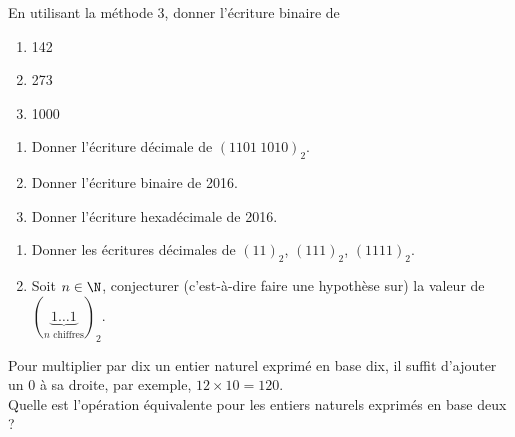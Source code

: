 \documentclass[a4paper,12pt,french]{book}
\begin{document}
\begin{exercice}[]
En utilisant la méthode 3, donner l'écriture binaire de 
\begin{enumerate}[\bfseries 1.]
	\item 	142
	\item 	273
	\item 	1000
\end{enumerate}
\end{exercice}

\begin{exercice}
\begin{enumerate}[--]
		\item 	Donner l'écriture décimale de $(1101\ 1010)_2$.
		\item 	Donner l'écriture binaire de 2016.
		\item 	Donner l'écriture hexadécimale de 2016.
\end{enumerate}
\end{exercice}

\begin{exercice}
\begin{enumerate}[--]
		\item 	Donner les écritures décimales de $(11)_2$, $(111)_2$, $(1111)_2$.
		\item   Soit $n \in \N$, conjecturer (c'est-à-dire faire une hypothèse sur) la valeur de $ \left(\underbrace{1\ldots 1}_{n \textrm{ chiffres}}\right)_2$.
\end{enumerate}
\end{exercice}


\begin{exercice}
Pour multiplier par dix un entier naturel exprimé en base dix, il suffit d'ajouter un 0 à sa
droite, par exemple, $12\times 10 = 120$.\\
Quelle est l'opération équivalente pour les entiers naturels exprimés en base deux ?
\end{exercice}
\end{document}
